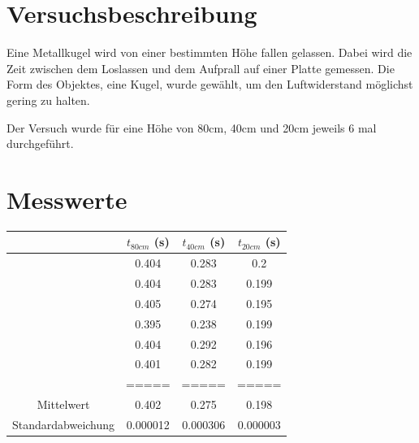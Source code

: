 \documentclass[8pt, letterpaper]{article}
\begin{document}

\section{Versuchsbeschreibung}
Eine Metallkugel wird von einer bestimmten Höhe fallen gelassen. Dabei wird die Zeit zwischen dem Loslassen und dem Aufprall auf einer Platte gemessen. Die Form des Objektes, eine Kugel, wurde gewählt, um den Luftwiderstand möglichst gering zu halten.

Der Versuch wurde für eine Höhe von 80cm, 40cm und 20cm jeweils 6 mal durchgeführt.

\section{Messwerte}
\begin{tabular} { c|c|c|c }
  & $t_{80cm}$ (s) & $t_{40cm}$ (s) & $t_{20cm}$ (s) \\
  \hline
  & 0.404 & 0.283 & 0.2 \\
  & 0.404 & 0.283 & 0.199 \\
  & 0.405 & 0.274 & 0.195 \\
  & 0.395 & 0.238 & 0.199 \\
  & 0.404 & 0.292 & 0.196 \\
  & 0.401 & 0.282 & 0.199 \\
  & ===== & ===== & ===== \\
  Mittelwert & 0.402 & 0.275 & 0.198 \\
  Standardabweichung & 0.000012 & 0.000306 & 0.000003
\end{tabular}

\hfill \break

\end{document}
